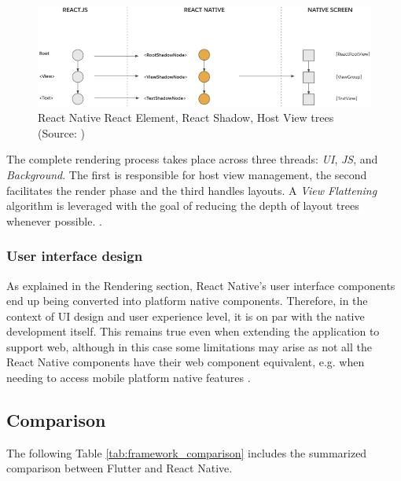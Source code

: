 \begin{figure}[h]
    \centering
    \includegraphics[width=\textwidth]{img/rn_trees}
    \caption{React Native React Element, React Shadow, Host View trees (Source: \cite{react_native_docs_render})}
    \label{fig:rn_trees}
\end{figure}

The complete rendering process takes place across three threads: \emph{UI}, \emph{JS}, and \emph{Background}. The first is responsible for host view management, the second facilitates the render phase and the third handles layouts. A \emph{View Flattening} algorithm is leveraged with the goal of reducing the depth of layout trees whenever possible.  \cite{react_native_docs_render,react_native_docs_view_flattening,react_native_docs_threading}. 

\subsubsection*{User interface design}

As explained in the Rendering section, React Native's user interface components end up being converted into platform native components. Therefore, in the context of UI design and user experience level, it is on par with the native development itself. This remains true even when extending the application to support web, although in this case some limitations may arise as not all the React Native components have their web component equivalent, e.g. when needing to access mobile platform native features \cite{harsh_complete_guide_to_rn_web}.

\subsection{Comparison}

The following Table \ref{tab:framework_comparison} includes the summarized comparison between Flutter and React Native.

